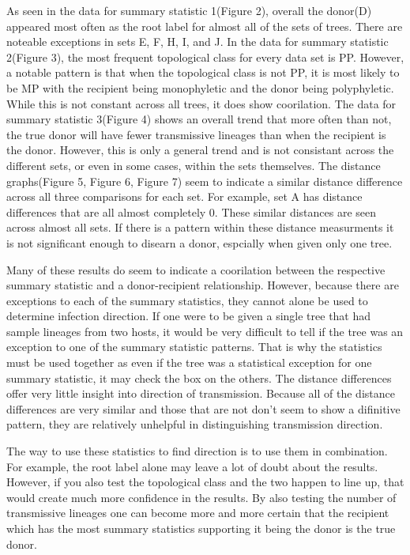 \documentclass[final,5p,times,twocolumn,authoryear]{elsarticle}
\begin{document}
As seen in the data for summary statistic 1(Figure 2), overall the donor(D) appeared most often as the root label for almost all of the sets of trees. There are noteable exceptions in sets E, F, H, I, and J. In the data for summary statistic 2(Figure 3), the most frequent topological class for every data set is PP. However, a notable pattern is that when the topological class is not PP, it is most likely to be MP with the recipient being monophyletic and the donor being polyphyletic. While this is not constant across all trees, it does show coorilation. The data for summary statistic 3(Figure 4) shows an overall trend that more often than not, the true donor will have fewer transmissive lineages than when the recipient is the donor. However, this is only a general trend and is not consistant across the different sets, or even in some cases, within the sets themselves. The distance graphs(Figure 5, Figure 6, Figure 7) seem to indicate a similar distance difference across all three comparisons for each set. For example, set A has distance differences that are all almost completely 0. These similar distances are seen across almost all sets. If there is a pattern within these distance measurments it is not significant enough to disearn a donor, espcially when given only one tree.

Many of these results do seem to indicate a coorilation between the respective summary statistic and a donor-recipient relationship. However, because there are exceptions to each of the summary statistics, they cannot alone be used to determine infection direction. If one were to be given a single tree that had sample lineages from two hosts, it would be very difficult to tell if the tree was an exception to one of the summary statistic patterns. That is why the statistics must be used together as even if the tree was a statistical exception for one summary statistic, it may check the box on the others. The distance differences offer very little insight into direction of transmission. Because all of the distance differences are very similar and those that are not don't seem to show a difinitive pattern, they are relatively unhelpful in distinguishing transmission direction.

The way to use these statistics to find direction is to use them in combination. For example, the root label alone may leave a lot of doubt about the results. However, if you also test the topological class and the two happen to line up, that would create much more confidence in the results. By also testing the number of transmissive lineages one can become more and more certain that the recipient which has the most summary statistics supporting it being the donor is the true donor.
\end{document}
